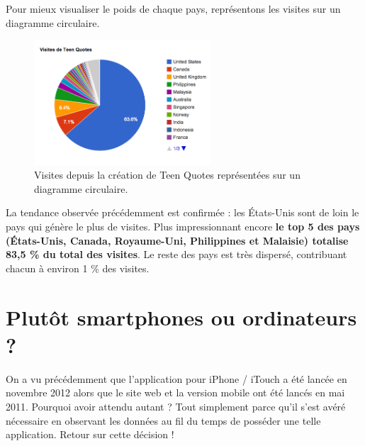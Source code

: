 \documentclass{report}
\begin{document}
	\vspace{10px}
	Pour mieux visualiser le poids de chaque pays, représentons les visites sur un diagramme circulaire.
	\begin{figure}[H]
		\center
		\includegraphics[width=250px]{images/visitesMondialesCamembert.png}
		\caption{Visites depuis la création de Teen Quotes représentées sur un diagramme circulaire.}
	\end{figure}
	La tendance observée précédemment est confirmée : les États-Unis sont de loin le pays qui génère le plus de visites. Plus impressionnant encore \textbf{le top 5 des pays (États-Unis, Canada, Royaume-Uni, Philippines et Malaisie) totalise 83,5 \% du total des visites}. Le reste des pays est très dispersé, contribuant chacun à environ 1 \% des visites.

	\section{Plutôt smartphones ou ordinateurs ?}
	On a vu précédemment que l'application pour iPhone / iTouch a été lancée en novembre 2012 alors que le site web et la version mobile ont été lancés en mai 2011. Pourquoi avoir attendu autant ? Tout simplement parce qu'il s'est avéré nécessaire en observant les données au fil du temps de posséder une telle application. Retour sur cette décision !\\
\end{document}
